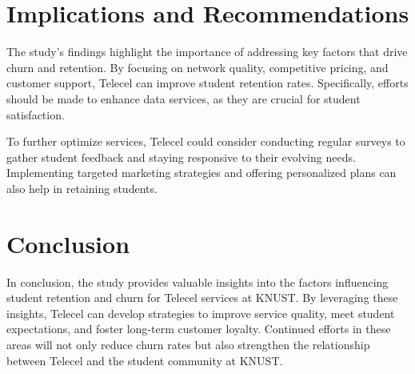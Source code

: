 \documentclass[12pt]{report} %
\begin{document}
\section{Implications and Recommendations}

The study's findings highlight the importance of addressing key factors that drive churn and retention. By focusing on network quality, competitive pricing, and customer support, Telecel can improve student retention rates. Specifically, efforts should be made to enhance data services, as they are crucial for student satisfaction.

To further optimize services, Telecel could consider conducting regular surveys to gather student feedback and staying responsive to their evolving needs. Implementing targeted marketing strategies and offering personalized plans can also help in retaining students.

\section{Conclusion}

In conclusion, the study provides valuable insights into the factors influencing student retention and churn for Telecel services at KNUST. By leveraging these insights, Telecel can develop strategies to improve service quality, meet student expectations, and foster long-term customer loyalty. Continued efforts in these areas will not only reduce churn rates but also strengthen the relationship between Telecel and the student community at KNUST.
\end{document}
